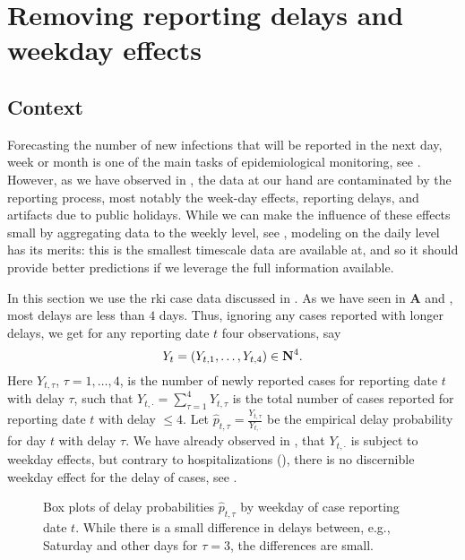 \section{Removing reporting delays and weekday effects}%
\label{sec:spatial_reproduction_number_model}
\subsection{Context}
Forecasting the number of new infections that will be reported in the next day, week or month is one of the main tasks of epidemiological monitoring, see . However, as we have observed in , the data at our hand are contaminated by the reporting process, most notably the week-day effects, reporting delays, and artifacts due to public holidays.
While we can make the influence of these effects small by aggregating data to the weekly level, see , modeling on the daily level has its merits: this is the smallest timescale data are available at, and so it should provide better predictions if we leverage the full information available. 

In this section we use the \acrshort{rki} case data discussed in . As we have seen in  \textbf{A} and , most delays are less than $4$ days. Thus, ignoring any cases reported with longer delays, we get for any reporting date $t$ four observations, say 
$$
    Y_{t} = \left( Y_{t, 1}, \dots, Y_{t, 4} \right) \in \mathbf N^{4}.
$$
Here $Y_{t,\tau}$, $\tau = 1, \dots, 4$, is the number of newly reported cases for reporting date $t$ with delay $\tau$, such that $Y_{t,\cdot} = \sum_{\tau = 1}^4 Y_{t, \tau}$ is the total number of cases reported for reporting date $t$ with delay $\leq 4$. 
Let $\hat p_{t, \tau} = \frac{Y_{t,\tau}}{Y_{t,\cdot}}$ be the empirical delay probability for day $t$ with delay $\tau$. We have already observed in , that $Y_{t, \cdot}$ is subject to weekday effects, but contrary to hospitalizations (), there is no discernible weekday effect for the delay of cases, see .

\begin{figure}
    \resizebox{\textwidth}{!}{%
    }
    \caption{Box plots of delay probabilities $\hat p_{t,\tau}$ by weekday of case reporting date $t$. While there is a small difference in delays between, e.g., Saturday and other days for $\tau = 3$, the differences are small.}
    \label{fig:weekday_effect_delays}
\end{figure}

